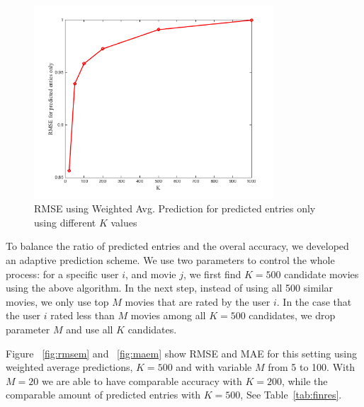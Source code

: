 \begin{figure}[!ht]
  \centering \includegraphics[width=0.8\textwidth]{images/rmsep.png}
  \caption{RMSE using Weighted Avg. Prediction for predicted entries
    only using different $K$ values}
  \label{fig:rmsepred}
\end{figure}

To balance the ratio of predicted entries and the overal accuracy, we
developed an adaptive prediction scheme. We use two parameters to
control the whole process: for a specific user $i$, and movie $j$, we
first find $K=500$ candidate movies using the above algorithm. In the
next step, instead of using all 500 similar movies, we only use top
$M$ movies that are rated by the user $i$. In the case that the user
$i$ rated less than $M$ movies among all $K=500$ candidates, we drop
parameter $M$ and use all $K$ candidates.


Figure ~\ref{fig:rmsem} and ~\ref{fig:maem} show RMSE and MAE for this
setting using weighted average predictions, $K=500$ and with variable
$M$ from 5 to 100. With $M=20$ we are able to have comparable accuracy
with $K=200$, while the comparable amount of predicted entries with
$K=500$, See Table~\ref{tab:finres}.

